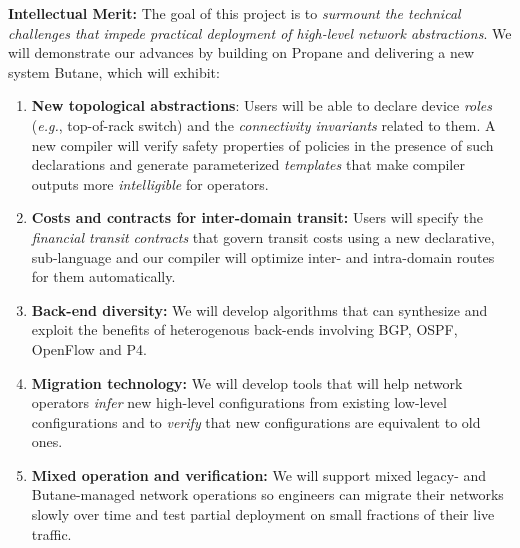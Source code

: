 \documentclass[12pt]{article}
\makeatletter
\newcommand{\Propane}{{\sc Propane}\@\xspace}
\newcommand{\Name}{{\sc Butane}\@\xspace}
\makeatother
\begin{document}
\noindent
\textbf{Intellectual Merit:} 
The goal of this project is to 
{\em surmount the technical challenges that impede practical 
deployment of high-level network abstractions}.  We will demonstrate
our advances by building on \Propane and delivering a new system \Name, which
will exhibit:  
\begin{enumerate}
\item {\bf New topological abstractions}:  Users will be able to declare device 
\emph{roles} (\emph{e.g.}, top-of-rack switch)
and the \emph{connectivity invariants} related to them.  A new compiler
will verify safety properties of policies in the presence of such 
declarations and generate parameterized \emph{templates}
that make compiler outputs more \emph{intelligible} for operators.  
\item {\bf Costs and contracts for inter-domain transit:}
Users will specify the 
\emph{financial transit contracts} that govern transit
costs using a new declarative, sub-language and our compiler will
optimize inter- and intra-domain routes for them automatically.
\item {\bf Back-end diversity:}  We will develop algorithms that
can synthesize and exploit the benefits of heterogenous back-ends 
involving BGP, OSPF, OpenFlow and P4.
\item {\bf Migration technology:} We will develop
tools that will help network operators \emph{infer} 
new high-level configurations from existing low-level configurations
and to \emph{verify} that new configurations are equivalent to old ones.
\item {\bf Mixed operation and verification:} We will support mixed
legacy- and \Name-managed network operations so engineers can
migrate their networks slowly over time and test partial deployment on
small fractions of their live traffic.
\end{enumerate}
\end{document}
